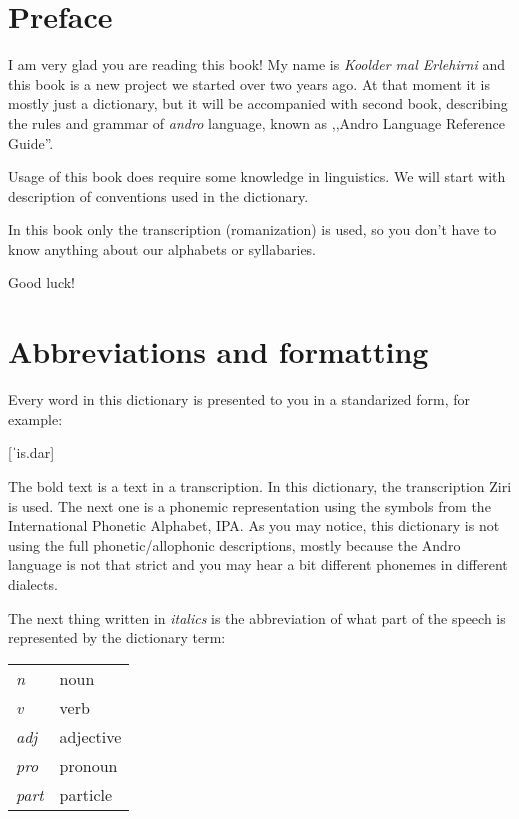 \newpage

\section{Preface}

\begin{spacing}{1.1}

    I am very glad you are reading this book! My name is \emph{Koolder mal
        Erlehirni} and this book is a new project we started over two years ago. At that
    moment it is mostly just a dictionary, but it will be accompanied with second
    book, describing the rules and grammar of \emph{andro} language, known as
    ,,Andro Language Reference Guide''.

    Usage of this book does require some knowledge in linguistics. We will start
    with description of conventions used in the dictionary.

    In this book only the transcription (romanization) is used, so you don't have to
    know anything about our alphabets or syllabaries.

    \bigskip

    Good luck!

    \section[Abbreviations and format]{Abbreviations and formatting}

    Every word in this dictionary is presented to you in a standarized form, for
    example:

    [ˈis.dar]

    The bold text is a text in a transcription. In this dictionary, the
    transcription Ziri is used. The next one is a phonemic representation using the
    symbols from the International Phonetic Alphabet, IPA. As you may notice, this
    dictionary is not using the full phonetic/allophonic descriptions, mostly
    because the Andro language is not that strict and you may hear a bit different
    phonemes in different dialects.

    The next thing written in \emph{italics} is the abbreviation of what part of the
    speech is represented by the dictionary term:

    \begin{table}[h]
        \begin{tabular}{ll}
            \emph{n}    & noun      \\
            \emph{v}    & verb      \\
            \emph{adj}  & adjective \\
            \emph{pro}  & pronoun   \\
            \emph{part} & particle
        \end{tabular}
    \end{table}


\end{spacing}

